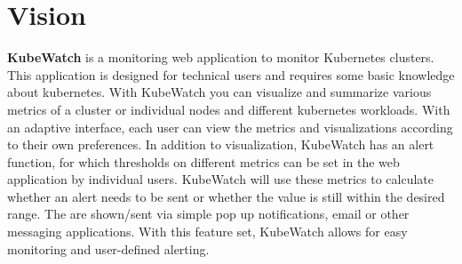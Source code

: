 \chapter{Vision}



\textbf{KubeWatch} is a monitoring web application to monitor Kubernetes clusters. This application is designed for technical users and requires some basic knowledge about kubernetes. With KubeWatch you can visualize and summarize various metrics of a cluster or individual nodes and different kubernetes workloads. With an adaptive interface, each user can view the metrics and visualizations according to their own preferences. In addition to visualization, KubeWatch has an alert function, for which thresholds on different metrics can be set in the web application by individual users. KubeWatch will use these metrics to calculate whether an alert needs to be sent or whether the value is still within the desired range. The are shown/sent via simple pop up notifications, email or other messaging applications. With this feature set, KubeWatch allows for easy monitoring and user-defined alerting.